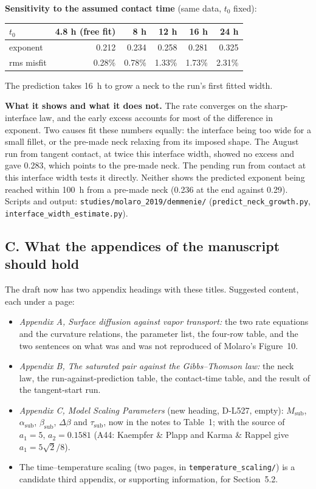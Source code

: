 \documentclass[11pt]{article}
\newcommand{\add}[1]{\textcolor{revA}{#1}}
\begin{document}
\textbf{Sensitivity to the assumed contact time} (same data, $t_0$ fixed):
\begin{center}\small\begin{tabular}{lrrrrr}\toprule
$t_0$ & 4.8 h (free fit) & 8 h & 12 h & 16 h & 24 h\\\midrule
exponent & 0.212 & 0.234 & 0.258 & 0.281 & 0.325\\
rms misfit & 0.28\% & 0.78\% & 1.33\% & 1.73\% & 2.31\%\\\bottomrule
\end{tabular}\end{center}
The prediction takes 16~h to grow a neck to the run's first fitted width.

\textbf{What it shows and what it does not.} The rate converges on the
sharp-interface law, and the early excess accounts for most of the
difference in exponent. Two causes fit these numbers equally: the interface
being too wide for a small fillet, or the pre-made neck relaxing from its
imposed shape. The August run from tangent contact, at twice this interface
width, showed no excess and gave 0.283, which points to the pre-made neck.
The pending run from contact at this interface width tests it directly.
Neither shows the predicted exponent being reached within 100~h from a
pre-made neck (0.236 at the end against 0.29). Scripts and output:
\texttt{studies/molaro\_2019/demmenie/} (\texttt{predict\_neck\_growth.py},
\texttt{interface\_width\_estimate.py}).

\subsection*{C. What the appendices of the manuscript should hold}
The draft now has two appendix headings with these titles. Suggested
content, each under a page:
\begin{itemize}
\item \emph{Appendix A, Surface diffusion against vapor transport:} the two
  rate equations and the curvature relations, the parameter list, the
  four-row table, and the two sentences on what was and was not reproduced
  of Molaro's Figure~10.
\item \emph{Appendix B, The saturated pair against the Gibbs--Thomson law:}
  the neck law, the run-against-prediction table, the contact-time table,
  and the result of the tangent-start run.
\item \add{\emph{Appendix C, Model Scaling Parameters} (new heading, D-L527, empty): $M_{\mathrm{sub}}$, $\alpha_{\mathrm{sub}}$, $\beta_{\mathrm{sub}}$, $\Delta\beta$ and $\tau_{\mathrm{sub}}$, now in the notes to Table~1; with the source of $a_1 = 5$, $a_2 = 0.1581$ (A44: Kaempfer \& Plapp and Karma \& Rappel give $a_1 = 5\sqrt{2}/8$).}
\item The time--temperature scaling (two pages, in
  \texttt{temperature\_scaling/}) is a
  candidate third appendix, or supporting information, for Section~5.2.
\end{itemize}
\end{document}
